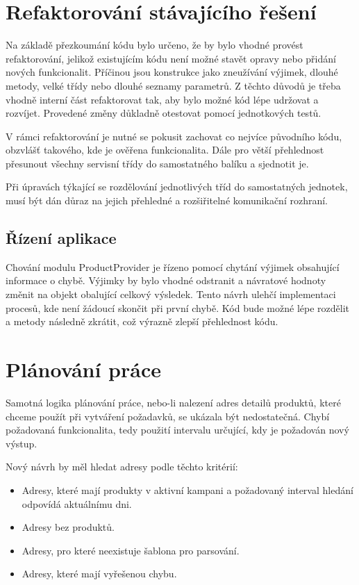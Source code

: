 \documentclass[thesis=B,czech]{FITthesis}[2012/06/26]
\begin{document}
\section{Refaktorování stávajícího řešení}
Na základě přezkoumání kódu bylo určeno, že by bylo vhodné provést refaktorování, jelikož existujícím kódu není možné stavět opravy nebo přidání nových funkcionalit. Příčinou jsou konstrukce jako zneužívání výjimek, dlouhé metody, velké třídy nebo dlouhé seznamy parametrů.
Z těchto důvodů je třeba vhodně interní část refaktorovat tak, aby bylo možné kód lépe udržovat a rozvíjet. Provedené změny důkladně 
otestovat pomocí jednotkových testů.
\par
V rámci refaktorování je nutné se pokusit zachovat co nejvíce původního kódu, obzvlášť takového, kde je ověřena funkcionalita.
Dále pro větší přehlednost přesunout všechny servisní třídy do samostatného balíku a sjednotit je.
\par
Při úpravách týkající se rozdělování jednotlivých tříd do samostatných jednotek, musí být dán důraz na jejich přehledné a rozšiřitelné komunikační rozhraní.

\subsection{Řízení aplikace}
Chování modulu ProductProvider je řízeno pomocí chytání výjimek obsahující informace o chybě. 
Výjimky by bylo vhodné odstranit a návratové hodnoty změnit na objekt obalující celkový výsledek. Tento návrh ulehčí implementaci procesů, kde není žádoucí
skončit při první chybě. Kód bude možné lépe rozdělit a metody následně zkrátit, což výrazně zlepší přehlednost kódu.

\section{Plánování práce}
Samotná logika plánování práce, nebo-li nalezení adres detailů produktů, které chceme použít při vytváření požadavků, se ukázala být nedostatečná. Chybí požadovaná funkcionalita, tedy použití intervalu určující, kdy je požadován nový výstup.
\par
Nový návrh by měl hledat adresy podle těchto kritérií:

\begin{itemize}
\item Adresy, které mají produkty v aktivní kampani a požadovaný interval hledání odpovídá aktuálnímu dni.
\item Adresy bez produktů.
\item Adresy, pro které neexistuje šablona pro parsování.
\item Adresy, které mají vyřešenou chybu.
\end{itemize}
\end{document}
